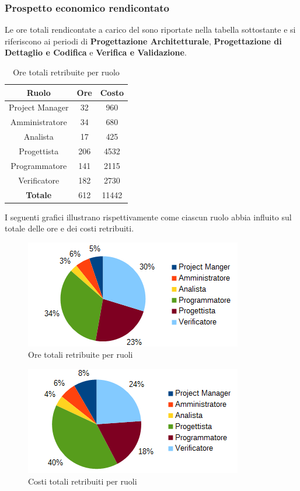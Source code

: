 		\subsubsection{Prospetto economico rendicontato}
		Le ore totali rendicontate a carico del  sono riportate nella tabella sottostante e si riferiscono ai periodi di \textbf{Progettazione Architetturale}, \textbf{Progettazione di Dettaglio e Codifica} e \textbf{Verifica e Validazione}. \\
		\begin{table}[H]
		\centering
		\begin{tabular}{|c|c|c|}
			\hline
			\textbf{Ruolo}		& \textbf{Ore}	& \textbf{Costo} \\
			\hline
			Project Manager		& 32			& 960	\\
			Amministratore		& 34			& 680	\\
			Analista			& 17			& 425	\\
			Progettista			& 206			& 4532	\\
			Programmatore		& 141			& 2115	\\
			Verificatore		& 182			& 2730	\\
			\hline
			\textbf{Totale}		& 612			& 11442	\\
			\hline
		\end{tabular}
		\caption{Ore totali retribuite per ruolo}
		\end{table}
		I seguenti grafici illustrano rispettivamente come ciascun ruolo abbia influito sul totale delle ore e dei costi retribuiti. \\
		\begin{figure}[H]
		\centering
			\includegraphics[scale=1]{immagini/grafici/orario_rendicontato-torta.png}
			\caption{Ore totali retribuite per ruoli}
		\end{figure}
		\begin{figure}[H]
			\centering
			\includegraphics[scale=1]{immagini/grafici/orario_rendicontato-torta-costo.png}
			\caption{Costi totali retribuiti per ruoli}
		\end{figure}
